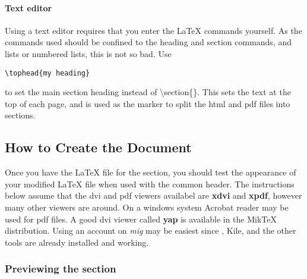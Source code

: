 \paragraph{Text editor}

Using a text editor requires that you enter the \LaTeX{} commands
yourself. As the commands used should be confined to the heading and
section commands, and lists or numbered lists, this is not so bad. Use 
\begin{verbatim}
\tophead{my heading}
\end{verbatim}
to set the main section heading instead of \textbackslash{}section\{\}. This sets the text at the top of each page, and 
is used as the marker to split the html and pdf files into sections.

%
%

\subsection{How to Create the Document}

Once you have the \LaTeX{} file for the section, you should test the
appearance of your modified \LaTeX{} file when used with the common
header. The instructions below assume that the dvi and pdf viewers
availabel are \textbf{xdvi} and \textbf{xpdf}, however many other
viewers are around. On a windows system Acrobat reader may be used
for pdf files. A good dvi viewer called \textbf{yap} is available
in the Mik\TeX{} distribution. Using an account on \textit{mig} may be easiest since 
\LyX{}, Kile, and the other tools are already installed and working.

\subsubsection{Previewing the section}

